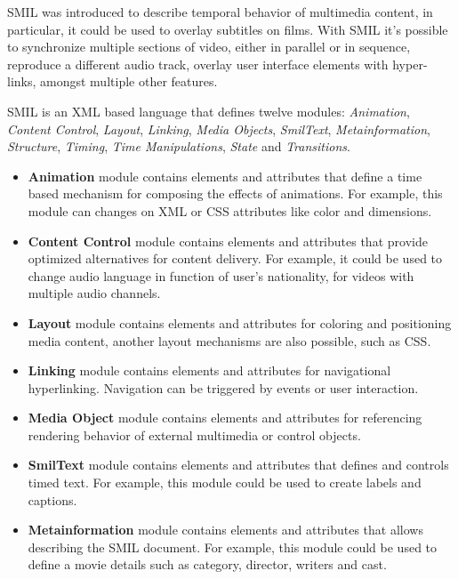   \ac{SMIL}\cite{smil} was introduced to describe temporal behavior of multimedia content, in particular, it could be used to overlay subtitles on films. With \ac{SMIL} it's possible to synchronize multiple sections of video, either in parallel or in sequence, reproduce a different audio track, overlay user interface elements with hyper-links, amongst multiple other features.

  \ac{SMIL} is an \ac{XML} based language that defines twelve modules: \textit{Animation}, \textit{Content Control}, \textit{Layout}, \textit{Linking}, \textit{Media Objects}, \textit{SmilText}, \textit{Metainformation}, \textit{Structure}, \textit{Timing}, \textit{Time Manipulations}, \textit{State} and \textit{Transitions}.


\begin{itemize}

  \item \textbf{Animation} module contains elements and attributes that define a time based mechanism for composing the effects of animations. For example, this module can changes on \ac{XML} or \ac{CSS} attributes like color and dimensions.  

  \item \textbf{Content Control} module contains elements and attributes that provide optimized alternatives for content delivery. For example, it could be used to change audio language in function of user's nationality, for videos with multiple audio channels.

  \item \textbf{Layout} module contains elements and attributes for coloring and positioning media content, another layout mechanisms are also possible, such as \ac{CSS}.

  \item \textbf{Linking} module contains elements and attributes for navigational hyperlinking. Navigation can be triggered by events or user interaction.

  \item \textbf{Media Object} module contains elements and attributes for referencing rendering behavior of external multimedia or control objects.

  \item \textbf{SmilText} module contains elements and attributes that defines and controls timed text. For example, this module could be used to create labels and captions.


  \item \textbf{Metainformation} module contains elements and attributes that allows describing the \ac{SMIL} document. For example, this module could be used to define a movie details such as category, director, writers and cast.


\end{itemize}
